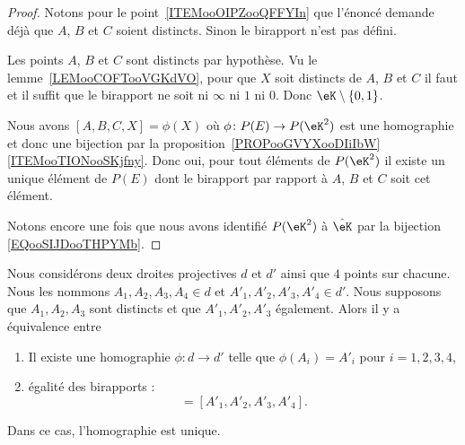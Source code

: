 \begin{proof}
	Notons pour le point~\ref{ITEMooOIPZooQFFYIn} que l'énoncé demande déjà que \( A\), \( B\) et \( C\) soient distincts. Sinon le birapport n'est pas défini.
	\begin{subproof}
		\spitem[\ref{ITEMooOIPZooQFFYIn}]

		Les points \( A\), \( B\) et \( C\) sont distincts par hypothèse. Vu le lemme~\ref{LEMooCOFTooVGKdVO}, pour que \( X\) soit distincts de \( A\), \( B\) et \( C\) il faut et il suffit que le birapport ne soit ni \( \infty\) ni \( 1\) ni \( 0\). Donc \( \eK\setminus\{ 0,1 \}\).

		\spitem[\ref{ITEMooBEBEooVfiJXY}]

		Nous avons \( [A,B,C,X]=\phi(X)\) où \( \phi\colon P(E)\to P(\eK^2)\) est une homographie et donc une bijection par la proposition~\ref{PROPooGVYXooDIiIbW}\ref{ITEMooTIONooSKjfny}. Donc oui, pour tout éléments de \( P(\eK^2)\) il existe un unique élément de \( P(E)\) dont le birapport par rapport à \( A\), \( B\) et \( C\) soit cet élément.

	\end{subproof}
	Notons encore une fois que nous avons identifié \( P(\eK^2)\) à \( \hat\eK\) par la bijection \eqref{EQooSIJDooTHPYMb}.
\end{proof}

\begin{proposition}      \label{PROPooMGYDooHqSoJs}
	Nous considérons deux droites projectives \( d\) et \( d'\) ainsi que \( 4\) points sur chacune. Nous les nommons \( A_1,A_2,A_3,A_4\in d\) et \( A'_1,A'_2,A'_3,A'_4\in d'\). Nous supposons que \( A_1,A_2,A_3\) sont distincts et que \( A'_1,A'_2,A'_3\) également. Alors il y a équivalence entre
	\begin{enumerate}
		\item       \label{ITEMooIDKBooXHnNDi}
		      Il existe une homographie \( \phi\colon d\to d'\) telle que \( \phi(A_i)=A'_i\) pour \( i=1,2,3,4\),
		\item       \label{ITEMooCDWAooIckJwT}
		      égalité des birapports :
		      \begin{equation}
			      [A_1,A_2,A_3,A_4]=[A'_1,A'_2,A'_3,A'_4].
		      \end{equation}
	\end{enumerate}
	Dans ce cas, l'homographie est unique.
\end{proposition}

